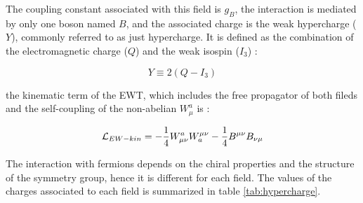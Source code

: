 The coupling constant associated with this field is $g_B$, the interaction is mediated by only one boson named $B$, and the associated charge is the weak hypercharge ($Y$), commonly referred to as just hypercharge. It is defined as the combination of the electromagnetic charge ($Q$) and the weak isospin ($I_3$) :

\begin{equation}
    Y \equiv 2(Q - I_3)
\end{equation}

the kinematic term of the EWT, which includes the free propagator of both fileds and the self-coupling of the non-abelian $W_{\mu}^a$ is :

\begin{equation}
    \mathcal{L}_{EW-kin} = -\frac{1}{4}W_{\mu\nu}^a W^{\mu\nu}_a - \frac{1}{4} B^{\mu\nu}B_{\nu\mu}
\end{equation}

The interaction with fermions depends on the chiral properties and the structure of the symmetry group, hence it is different for each field. The values of the charges associated to each field is summarized in table \ref{tab:hypercharge}.

\begin{table}[h]
    \centering
    \caption{Values of the electroweak charges (weak isospin $I_3$, hypercharge $Y$ and electromagnetic charge $Q$) for the fermions, according to their type and chirality.}
    \label{tab:hypercharge}
\end{table}

